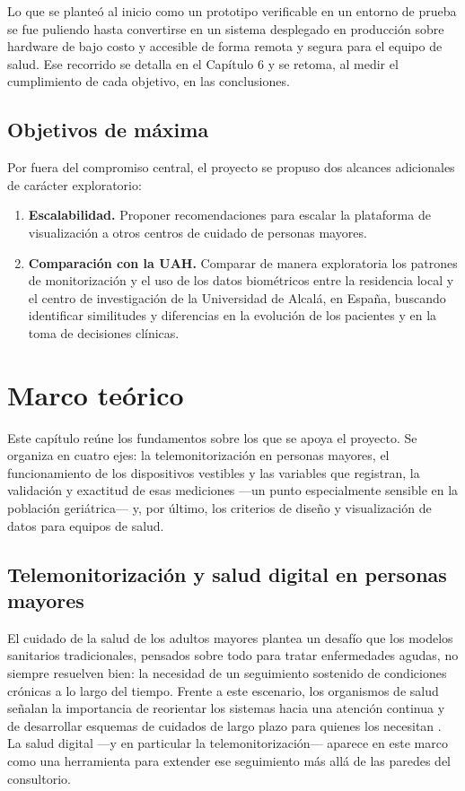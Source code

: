 \documentclass[12pt,a4paper]{article}
\begin{document}
     Lo que se planteó al inicio como un prototipo verificable en un entorno de prueba se fue puliendo hasta convertirse en un sistema desplegado en producción sobre hardware de bajo costo y accesible de forma remota y segura para el equipo de salud. Ese recorrido se detalla en el Capítulo 6 y se retoma, al medir el cumplimiento de cada objetivo, en las conclusiones.

    \subsection{Objetivos de máxima}
    Por fuera del compromiso central, el proyecto se propuso dos alcances adicionales de carácter exploratorio:
    \begin{enumerate}
        \item \textbf{Escalabilidad.} Proponer recomendaciones para escalar la plataforma de visualización a otros centros de cuidado de personas mayores.

        \item \textbf{Comparación con la UAH.} Comparar de manera exploratoria los patrones de monitorización y el uso de los datos biométricos entre la residencia local y el centro de investigación de la Universidad de Alcalá, en España, buscando identificar similitudes y diferencias en la evolución de los pacientes y en la toma de decisiones clínicas.
    \end{enumerate}
\newpage

\section{Marco teórico}

    Este capítulo reúne los fundamentos sobre los que se apoya el proyecto. Se organiza en cuatro ejes: la telemonitorización en personas mayores, el funcionamiento de los dispositivos vestibles y las variables que registran, la validación y exactitud de esas mediciones —un punto especialmente sensible en la población geriátrica— y, por último, los criterios de diseño y visualización de datos para equipos de salud.

    \subsection{Telemonitorización y salud digital en personas mayores}
    El cuidado de la salud de los adultos mayores plantea un desafío que los modelos sanitarios tradicionales, pensados sobre todo para tratar enfermedades agudas, no siempre resuelven bien: la necesidad de un seguimiento sostenido de condiciones crónicas a lo largo del tiempo. Frente a este escenario, los organismos de salud señalan la importancia de reorientar los sistemas hacia una atención continua y de desarrollar esquemas de cuidados de largo plazo para quienes los necesitan \cite{who_ageing}. La salud digital —y en particular la telemonitorización— aparece en este marco como una herramienta para extender ese seguimiento más allá de las paredes del consultorio.
\end{document}
